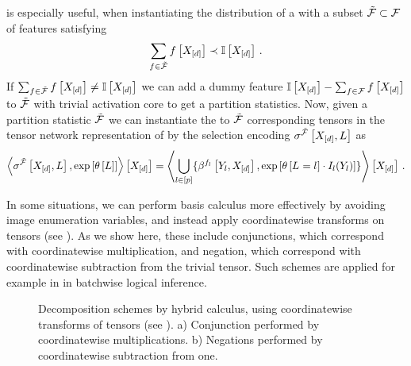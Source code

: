  is especially useful, when instantiating the distribution of a \HybridLogicNetwork{} with a subset $\tilde{\mathcal{F}}\subset\mathcal{F}$ of features satisfying
\begin{align*}
    \sum_{f\in\tilde{\mathcal{F}}} f\left[X_{[d]}\right] \prec \mathbb{I}\left[X_{[d]}\right] \, .
\end{align*}
If $\sum_{f\in\tilde{\mathcal{F}}} f\left[X_{[d]}\right] \neq \mathbb{I}\left[X_{[d]}\right]$ we can add a dummy feature $\mathbb{I}\left[X_{[d]}\right]-\sum_{f\in\mathcal{F}} f\left[X_{[d]}\right]$ to $\tilde{\mathcal{F}}$ with trivial activation core to get a partition statistics.
Now, given a partition statistic $\tilde{\mathcal{F}}$ we can instantiate the to $\tilde{\mathcal{F}}$ corresponding tensors in the tensor network representation of  by the selection encoding $\sigma^{\tilde{\mathcal{F}}}\left[X_{[d]},L\right]$ as
\begin{align*}
    \left\langle \sigma^{\tilde{\mathcal{F}}}\left[X_{[d]},L\right],\mathrm{exp}\left[\theta\left[L\right]\right]\right\rangle \left[ X_{[d]} \right]
    = \left\langle \bigcup_{l\in[p]}\{\beta^{f_{l}}\left[Y_{l},X_{[d]}\right],\mathrm{exp}\left[\theta\left[L_{}=l_{}\right]\cdot I_{l}(Y_{l})\right]\}\right\rangle \left[ X_{[d]} \right] \, .
\end{align*}


\label{sec:hybridCalculus}

In some situations, we can perform basis calculus more effectively by avoiding image enumeration variables, and instead apply coordinatewise transforms on tensors (see ).
As we show here, these include conjunctions, which correspond with coordinatewise multiplication, and negation, which correspond with coordinatewise subtraction from the trivial tensor.
Such schemes are applied for example in \cite{tsilionis_tensor-based_2024} in batchwise logical inference.

\begin{figure}
    \begin{center}
        
    \end{center}
    \caption{Decomposition schemes by hybrid calculus, using coordinatewise transforms of tensors (see ).
    a) Conjunction performed by coordinatewise multiplications.
    b) Negations performed by coordinatewise subtraction from one.}\label{fig:ConNegDecomposition}
\end{figure}

